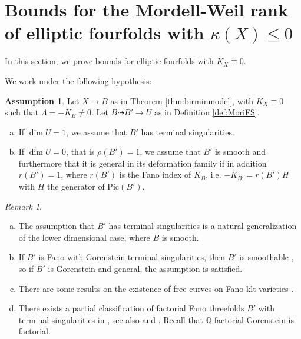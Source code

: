 \documentclass[11pt]{amsart}
\theoremstyle{definition}
\theoremstyle{definition}
\theoremstyle{remark}
\newtheorem{remark}[theorem]{Remark}
\theoremstyle{remark}
\theoremstyle{definition}
\theoremstyle{conjecture}
\newtheorem{assumption}[theorem]{Assumption}
\newcommand{\Pic}{\mathrm{Pic}}
\begin{document}
\section{ Bounds for the Mordell-Weil rank of elliptic 
fourfolds with  
$\kappa(X) \leq 0$} \label{sec:4folds}

 In this section, we prove bounds for elliptic fourfolds with $K_X \equiv 0$. 


We work under the following hypothesis:

 \color{black}
\begin{assumption}\label{Assumption} Let $X \to B$ as in Theorem \ref{thm:birminmodel}, 
with $K_X  \equiv 0$ such that $\Lambda = - K_B \neq 0$. Let $B \dasharrow B' \to  U $ as in  Definition \ref{def:MoriFS}.
\begin{enumerate}[(a)]
\item   If  $\dim U= 1$, we assume that $B'$ has terminal singularities.\color{black}
\item  If  $\dim U= 0$, that is $\rho(B')=1$, we assume that 
$B'$ is smooth and furthermore
 that it is general in its deformation family if in addition $r(B')=1$, where 
 $r(B')$ is the Fano index of $K_B$, i.e. $-K_{B'} = r({B'}) H$ with $H$ the generator of $\Pic(B')$.


\end{enumerate}

 
 
 \end{assumption}




\begin{remark}\label{remark:OnAssumption4Folds} 
\begin{enumerate}[(a)]
\item The assumption that $B'$  has  terminal singularities is a natural generalization of the  lower dimensional case, where $B$  is smooth.  
\item If $B'$ is Fano with Gorenstein terminal singularities, then $B'$ is smoothable \cite{Namikawa1997}, so  if $B'$ is Gorenstein and general, the assumption is satisfied. 

\item There are some  results on the existence of free curves on Fano klt varieties \cite{jovinellyLehemannRiedl-DeJong2026freecurvesfundamentalgroups}.
\item There exists a partial classification of  factorial Fano threefolds $B'$ with 
   terminal singularities in \cite{KuznetsovProKhorov2023}, see also \cite{bayer2025mukai} and \cite{kuznetsov2023onenodal}.  Recall that $\mathbb{Q}$-factorial Gorenstein is factorial.
  \end{enumerate}
  \end{remark} 
\end{document}
